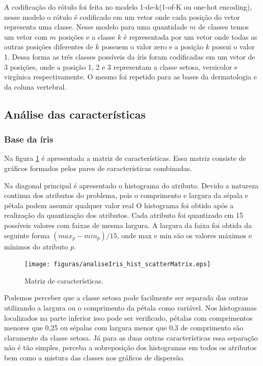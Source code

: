 \documentclass[ 
	article,			%
	11pt,				%
	oneside,			%
	a4paper,			%
	english,			%
	brazil,				%
	]{abntex2}
\begin{document}
A codificação do rótulo foi feita no modelo 1-de-k(1-of-K ou one-hot encoding),
nesse modelo o rótulo é codificado em um vetor onde cada posição do
vetor representa uma classe. Nesse modelo para uma quantidade $m$ de classes
temos um vetor com $m$ posições e a classe $k$ é representada por um vetor
onde todas as outras posições diferentes de $k$ possuem o valor zero e a
posição $k$ possui o valor 1. Dessa forma as três classes possíveis da íris
foram codificadas em um vetor de 3 posições, onde a posição 1, 2 e 3
representam a classe setosa, versicolor e virgínica respectivamente. O mesmo foi
repetido para as bases da dermatologia e da coluna vertebral.


\subsection{Análise das características}
\label{ss:analiCara}

\subsubsection{Base da íris}
Na figura \ref{fig:charMatrix} é apresentada a matriz de características. 
Essa matriz consiste de gráficos formados pelos pares de características
combinadas.

Na diagonal principal é apresentado o histograma do atributo.
Devido a natureza continua dos atributos do problema, pois o
comprimento e largura da sépala e pétala podem assumir qualquer valor real O
histograma foi obtido após a realização da quantização dos atributos.
Cada atributo foi quantizado em 15 possíveis valores com faixas de mesma largura. A
largura da faixa foi obtida da seguinte forma $(max_p - min_p)/15$, onde max e
min são os valores máximos e mínimos do atributo $p$.

\begin{figure}[!htb] \centering
\texttt{[image: figuras/analiseIris\_hist\_scatterMatrix.eps]}
\caption{Matriz de características.}
\label{fig:charMatrix}
\end{figure}

 Podemos perceber que a classe setosa pode facilmente ser separada das outras
 utilizando a largura ou o comprimento da pétala como variável. Nos histogramas
 localizados na parte inferior isso pode ser verificado, pétalas com
 comprimentos menores que 0,25 ou sépalas com largura menor que 0,3 de
 comprimento são claramente da classe setosa.
 Já para as duas outras características essa separação não é tão simples,
 perceba a sobreposição dos histogramas em todos os atributos bem como a mistura
 das classes nos gráficos de dispersão.
 
\end{document}
